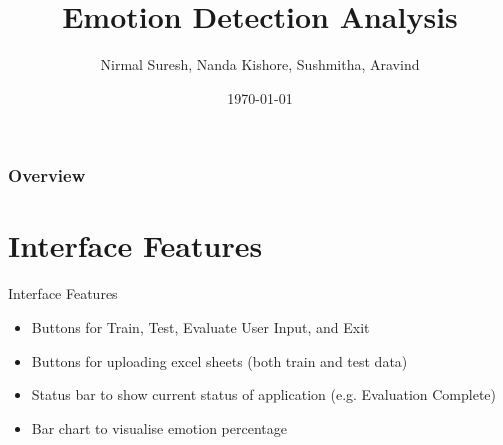 \documentclass{beamer}
\begin{document}
\title[Short title]{Emotion Detection Analysis} %

\author{Nirmal Suresh, Nanda Kishore, Sushmitha, Aravind} %

\date{\today} %

\begin{frame}
\titlepage %
\end{frame}

\begin{frame}
\frametitle{Overview} %
\tableofcontents %
\end{frame}



\section{Interface Features}
\begin{frame}{Interface Features}
\begin{itemize}
\item Buttons for Train, Test, Evaluate User Input, and Exit
\item Buttons for uploading excel sheets (both train and test data)
\item Status bar to show current status of application (e.g. Evaluation Complete)
\item Bar chart to visualise emotion percentage
\end{itemize}
\end{frame}
\end{document}
